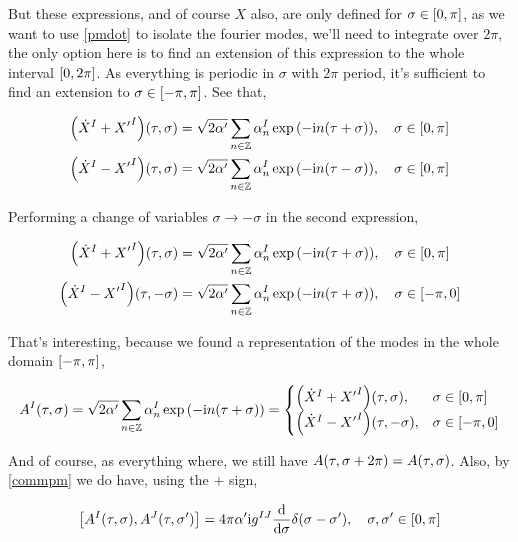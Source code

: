But these expressions, and of course $X$ also, are only defined for $\sigma\in\qty[0,\pi]$, as we want to use \ref{pmdot} to 
isolate the fourier modes, we'll need to integrate over $2\pi$, the only option here is to find an extension of this expression to the whole interval 
$\qty[0,2\pi]$. As everything is periodic in $\sigma$ with $2\pi$ period, it's sufficient to find an extension to $\sigma\in\qty[-\pi,\pi]$. 
See that,

\begin{align*}
    \qty({\dot X}^I+{X'}^I)\qty(\tau,\sigma)&=\sqrt{2\alpha'}\sum\limits_{n\in\mathbb Z}\alpha_n^I\exp\qty(-\im n\qty(\tau+ \sigma)),\ \ \ \sigma\in\qty[0,\pi]\\
    \qty({\dot X}^I-{X'}^I)\qty(\tau,\sigma)&=\sqrt{2\alpha'}\sum\limits_{n\in\mathbb Z}\alpha_n^I\exp\qty(-\im n\qty(\tau- \sigma)),\ \ \ \sigma\in\qty[0,\pi]
\end{align*}

Performing a change of variables $\sigma\rightarrow-\sigma$ in the second expression,

\begin{align*}
    \qty({\dot X}^I+{X'}^I)\qty(\tau,\sigma)&=\sqrt{2\alpha'}\sum\limits_{n\in\mathbb Z}\alpha_n^I\exp\qty(-\im n\qty(\tau+ \sigma)),\ \ \ \sigma\in\qty[0,\pi]\\
    \qty({\dot X}^I-{X'}^I)\qty(\tau,-\sigma)&=\sqrt{2\alpha'}\sum\limits_{n\in\mathbb Z}\alpha_n^I\exp\qty(-\im n\qty(\tau+\sigma)),\ \ \ \sigma\in\qty[-\pi,0]
\end{align*}

That's interesting, because we found a representation of the modes in the whole domain $\qty[-\pi,\pi]$,

\begin{align*}
    A^I\qty(\tau,\sigma)=\sqrt{2\alpha'}\sum\limits_{n\in\mathbb Z}\alpha_n^I\exp\qty(-\textnormal{i} n\qty(\tau+ \sigma))=\begin{cases}
        \qty({\dot X}^I+{X'}^I)\qty(\tau,\sigma),& \sigma\in\qty[0,\pi]\\
        \qty({\dot X}^I-{X'}^I)\qty(\tau,-\sigma),& \sigma\in\qty[-\pi,0]
    \end{cases}
\end{align*}

And of course, as everything where, we still have $A\qty(\tau,\sigma+2\pi)=A\qty(\tau,\sigma)$. Also, by \ref{commpm} we do have, using the $+$ sign,

\begin{align*}
    \comm{A^I\qty(\tau,\sigma)}{A^J\qty(\tau,\sigma')}=4\pi\alpha'\im g^{IJ}\dv{}{\sigma}\delta\qty(\sigma-\sigma'),\ \ \ \sigma,\sigma'\in\qty[0,\pi]
\end{align*}

